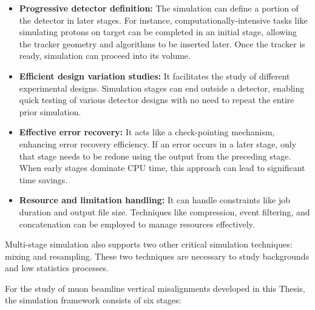 \begin{itemize}
    \item \textbf{Progressive detector definition:} The simulation can define a portion of the 
    detector in later stages. For instance, computationally-intensive tasks like simulating 
    protons on target can be completed in an initial stage, allowing the tracker geometry and 
    algorithms to be inserted later. Once the tracker is ready, simulation can proceed into its volume.
    \item \textbf{Efficient design variation studies:} It facilitates the study of different 
    experimental designs. Simulation stages can end outside a detector, enabling quick testing 
    of various detector designs with no need to repeat the entire prior simulation.
    \item \textbf{Effective error recovery:} It acts like a check-pointing mechanism, enhancing 
    error recovery efficiency. If an error occurs in a later stage, only that stage needs to be 
    redone using the output from the preceding stage. When early stages dominate CPU time, this 
    approach can lead to significant time savings.
    \item \textbf{Resource and limitation handling:} It can handle constraints like job duration 
    and output file size. Techniques like compression, event filtering, and concatenation can be 
    employed to manage resources effectively.
\end{itemize}

Multi-stage simulation also supports two other critical simulation techniques: mixing and resampling. 
These two techniques are necessary to study backgrounds and low statistics processes.

For the study of muon beamline vertical misalignments developed in this Thesis, the simulation 
framework consists of six stages:

